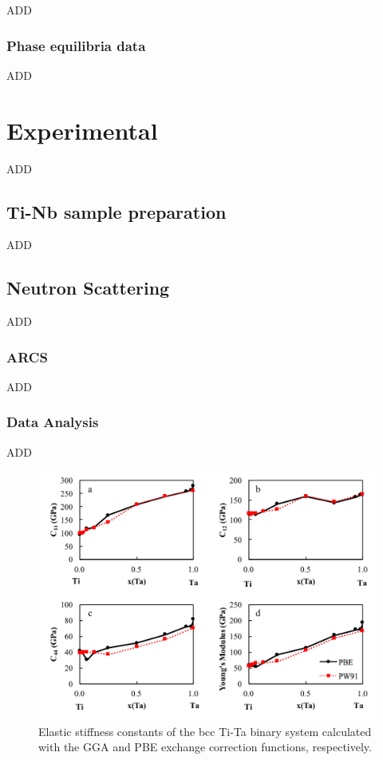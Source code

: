 ADD

\subsubsection{Phase equilibria data}

ADD

\section{Experimental}

ADD

\subsection{Ti-Nb sample preparation}

ADD

\subsection{Neutron Scattering}

ADD

\subsubsection{ARCS}

ADD

\subsubsection{Data Analysis}

ADD

\pagebreak
\begin{figure}[H]
	\centering
	\includegraphics[width=\textwidth]{Chapter-2/Figures/PBEvsPW91.png}
	\caption{Elastic stiffness constants of the bcc Ti-Ta binary system calculated with the GGA and PBE exchange correction functions, respectively.}
	\label{Ch2-figure:PBEvsPW91}
\end{figure}
